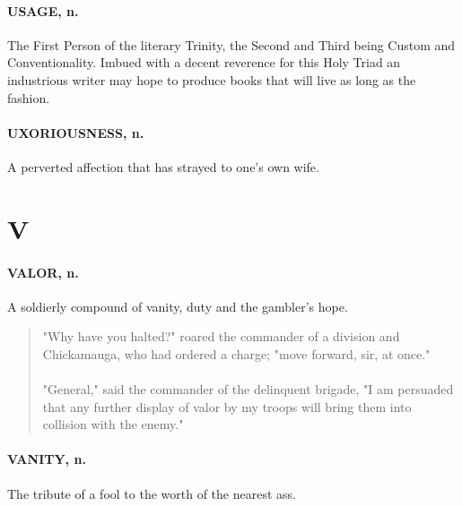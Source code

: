 \documentclass[11pt]{article}
\begin{document}
\paragraph{USAGE, n.}  The First Person of the literary Trinity, the Second and
Third being Custom and Conventionality.  Imbued with a decent
reverence for this Holy Triad an industrious writer may hope to
produce books that will live as long as the fashion.

\paragraph{UXORIOUSNESS, n.}  A perverted affection that has strayed to one's own
wife.



\section*{V}



\paragraph{VALOR, n.}  A soldierly compound of vanity, duty and the gambler's
hope.
\begin{quote}   "Why have you halted?" roared the commander of a division and
Chickamauga, who had ordered a charge; "move forward, sir, at once." \\
  \\
   "General," said the commander of the delinquent brigade, "I am
persuaded that any further display of valor by my troops will bring
them into collision with the enemy."
\end{quote}

\paragraph{VANITY, n.}  The tribute of a fool to the worth of the nearest ass.
\end{document}
